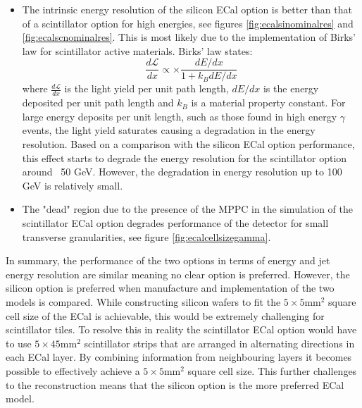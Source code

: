 \begin{itemize}
\item The intrinsic energy resolution of the silicon ECal option is better than that of a scintillator option for high energies, see figures \ref{fig:ecalsinominalres} and \ref{fig:ecalscnominalres}.  This is most likely due to the implementation of Birks' law \cite{BirksLaw} for scintillator active materials.  Birks' law states:
\begin{equation}
\frac{d\mathcal{L}}{dx} \propto \times \frac{dE/dx}{1+k_{B}dE/dx}
\end{equation}
where $\frac{d\mathcal{L}}{dx}$ is the light yield per unit path length, $dE/dx$ is the energy deposited per unit path length and $k_{B}$ is a material property constant.  For large energy deposits per unit length, such as those found in high energy $\gamma$ events, the light yield saturates causing a degradation in the energy resolution.  Based on a comparison with the silicon ECal option performance, this effect starts to degrade the energy resolution for the scintillator option around ~50 GeV.  However, the degradation in energy resolution up to 100 GeV is relatively small.
\item The "dead" region due to the presence of the MPPC in the simulation of the scintillator ECal option degrades performance of the detector for small transverse granularities, see figure \ref{fig:ecalcellsizegamma}.
\end{itemize}

In summary, the performance of the two options in terms of energy and jet energy resolution are similar meaning no clear option is preferred.  However, the silicon option is preferred when manufacture and implementation of the two models is compared.  While constructing silicon wafers to fit the $5 \times 5 \text{mm}^{2}$ square cell size of the ECal is achievable, this would be extremely challenging for scintillator tiles.  To resolve this in reality the scintillator ECal option would have to use $5 \times 45 \text{mm}^{2}$ scintillator strips that are arranged in alternating directions in each ECal layer.  By combining information from neighbouring layers it becomes possible to effectively achieve a $5 \times 5 \text{mm}^{2}$ square cell size.  This further challenges to the reconstruction means that the silicon option is the more preferred ECal model.  


